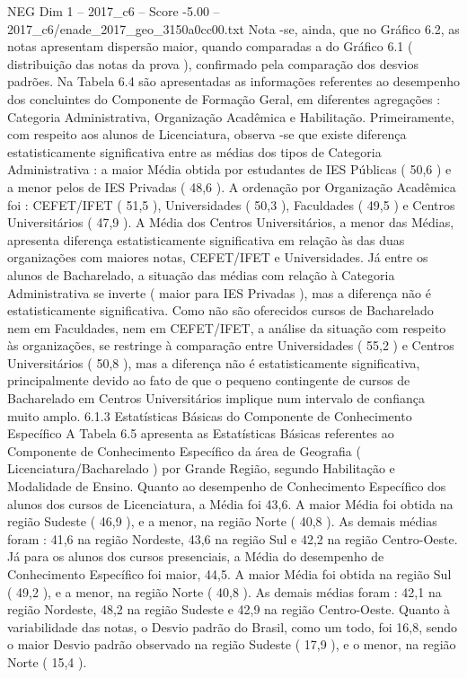 \begin{textsample}{NEG Dim 1 – 2017\_c6 – Score -5.00 – 2017\_c6/enade\_2017\_geo\_3150a0cc00.txt}
Nota -se, ainda, que no Gráfico 6.2, as notas apresentam dispersão maior, quando comparadas a do Gráfico 6.1 ( distribuição das notas da prova ), confirmado pela comparação dos desvios padrões.
Na Tabela 6.4 são apresentadas as informações referentes ao desempenho dos concluintes do Componente de Formação Geral, em diferentes agregações : Categoria Administrativa, Organização Acadêmica e Habilitação.
Primeiramente, com respeito aos alunos de Licenciatura, observa -se que existe diferença estatisticamente significativa entre as médias dos tipos de Categoria Administrativa : a maior Média obtida por estudantes de IES Públicas ( 50,6 ) e a menor pelos de IES Privadas ( 48,6 ).
A ordenação por Organização Acadêmica foi : CEFET/IFET ( 51,5 ), Universidades ( 50,3 ), Faculdades ( 49,5 ) e Centros Universitários ( 47,9 ).
A Média dos Centros Universitários, a menor das Médias, apresenta diferença estatisticamente significativa em relação às das duas organizações com maiores notas, CEFET/IFET e Universidades.
Já entre os alunos de Bacharelado, a situação das médias com relação à Categoria Administrativa se inverte ( maior para IES Privadas ), mas a diferença não é estatisticamente significativa.
Como não são oferecidos cursos de Bacharelado nem em Faculdades, nem em CEFET/IFET, a análise da situação com respeito às organizações, se restringe à comparação entre Universidades ( 55,2 ) e Centros Universitários ( 50,8 ), mas a diferença não é estatisticamente significativa, principalmente devido ao fato de que o pequeno contingente de cursos de Bacharelado em Centros Universitários implique num intervalo de confiança muito amplo. 6.1.3 Estatísticas Básicas do Componente de Conhecimento Específico A Tabela 6.5 apresenta as Estatísticas Básicas referentes ao Componente de Conhecimento Específico da área de Geografia ( Licenciatura/Bacharelado ) por Grande Região, segundo Habilitação e Modalidade de Ensino.
Quanto ao desempenho de Conhecimento Específico dos alunos dos cursos de Licenciatura, a Média foi 43,6.
A maior Média foi obtida na região Sudeste ( 46,9 ), e a menor, na região Norte ( 40,8 ).
As demais médias foram : 41,6 na região Nordeste, 43,6 na região Sul e 42,2 na região Centro-Oeste.
Já para os alunos dos cursos presenciais, a Média do desempenho de Conhecimento Específico foi maior, 44,5.
A maior Média foi obtida na região Sul ( 49,2 ), e a menor, na região Norte ( 40,8 ).
As demais médias foram : 42,1 na região Nordeste, 48,2 na região Sudeste e 42,9 na região Centro-Oeste.
Quanto à variabilidade das notas, o Desvio padrão do Brasil, como um todo, foi 16,8, sendo o maior Desvio padrão observado na região Sudeste ( 17,9 ), e o menor, na região Norte ( 15,4 ).

\end{textsample}
